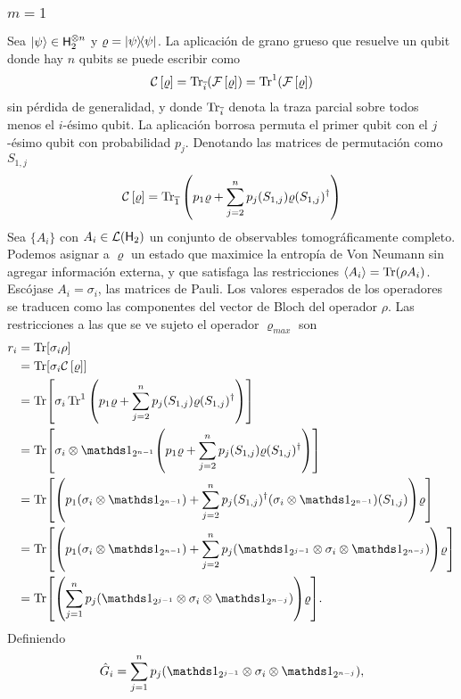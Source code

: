 \subsubsection{$m=1$}
Sea $\ket{\psi}\in{\sf H}_{2}^{\otimes n}$ y $\varrho=\dyad{\psi}$. La aplicación de grano grueso que resuelve un qubit donde hay $n$ qubits se puede escribir como
\begin{equation*}
    \mathcal{C}\left[\varrho\right]=\Tr_{\overline{i}}(\mathcal{F}\left[\varrho\right])=\Tr^{1}(\mathcal{F}\left[\varrho\right])
\end{equation*}
sin pérdida de generalidad, y donde $\Tr_{\overline{i}}$ denota la traza parcial sobre todos menos el $i$-ésimo qubit. La aplicación borrosa permuta el primer qubit con el $j$-ésimo qubit con probabilidad $p_{j}$. Denotando las matrices de permutación como $S_{1,j}$
\begin{equation*}
    \mathcal{C}\left[\varrho\right]=\Tr_{\overline{1}}\qty(p_{1}\varrho+\sum_{j=2}^{n}p_{j}(S_{1,j})\varrho(S_{1,j})^{\dagger})
\end{equation*}
Sea $\{A_{i}\}$ con $A_{i}\in\mathcal{L}({\sf H}_{2})$ un conjunto de observables tomográficamente completo. Podemos asignar a $\varrho$ un estado que maximice la entropía de Von Neumann sin agregar información externa, y que satisfaga las restricciones $\expval{A_{i}}=\Tr(\rho A_{i})$. Escójase ${A_{i}}={\sigma_{i}}$, las matrices de Pauli. Los valores esperados de los operadores se traducen como las componentes del vector de Bloch del operador $\rho$. Las restricciones a las que se ve sujeto el operador $\varrho_{max}$ son
\begin{align*}
    r_{i}&=\Tr[\sigma_{i}\rho]\\
    &=\Tr[\sigma_{i}\CG{\varrho}]\\
    &=\Tr[\sigma_{i}\Tr^{1}\qty(p_{1}\varrho+\sum_{j=2}^{n}p_{j}(S_{1,j})\varrho(S_{1,j})^{\dagger})]\\
    &=\Tr[\sigma_{i}\otimes\Id_{2^{n-1}}\qty(p_{1}\varrho+\sum_{j=2}^{n}p_{j}(S_{1,j})\varrho(S_{1,j})^{\dagger})]\\
    &=\Tr[\qty(p_{1}(\sigma_{i}\otimes\Id_{2^{n-1}})+\sum_{j=2}^{n}p_{j}(S_{1,j})^{\dagger}(\sigma_{i}\otimes\Id_{2^{n-1}})(S_{1,j}))\varrho]\\
    &=\Tr[\qty(p_{1}(\sigma_{i}\otimes\Id_{2^{n-1}})+\sum_{j=2}^{n}p_{j}(\Id_{2^{j-1}}\otimes\sigma_{i}\otimes\Id_{2^{n-j}}))\varrho]\\
    &=\Tr[\qty(\sum_{j=1}^{n}p_{j}(\Id_{2^{j-1}}\otimes\sigma_{i}\otimes\Id_{2^{n-j}}))\varrho].
\end{align*}
Definiendo
\begin{equation}\label{eq:Ghat}
    \hat{G}_{i}=\sum_{j=1}^{n}p_{j}(\Id_{2^{j-1}}\otimes\sigma_{i}\otimes\Id_{2^{n-j}}),
\end{equation}
